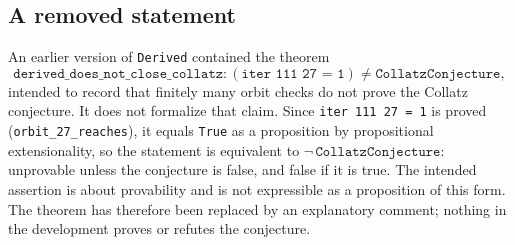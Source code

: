 \documentclass[11pt]{article}
\begin{document}
\subsection*{A removed statement}
An earlier version of \texttt{Derived} contained the theorem
\[\texttt{derived\_does\_not\_close\_collatz} : (\texttt{iter 111 27 = 1}) \neq \texttt{CollatzConjecture},\]
intended to record that finitely many orbit checks do not prove the Collatz conjecture. It does not formalize that claim. Since \texttt{iter 111 27 = 1} is proved (\texttt{orbit\_27\_reaches}), it equals \texttt{True} as a proposition by propositional extensionality, so the statement is equivalent to $\neg\,\texttt{CollatzConjecture}$: unprovable unless the conjecture is false, and false if it is true. The intended assertion is about provability and is not expressible as a proposition of this form. The theorem has therefore been replaced by an explanatory comment; nothing in the development proves or refutes the conjecture.
\end{document}
